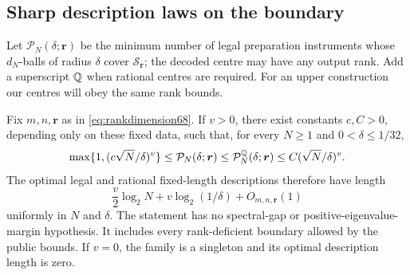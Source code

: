 \subsection{Sharp description laws on the boundary}
Let $\mathcal P_N(\delta;\boldsymbol r)$ be the minimum number of
legal preparation instruments whose $d_N$-balls of radius $\delta$
cover $\mathcal S_{\boldsymbol r}$; the decoded centre may have any
output rank. Add a superscript $\mathbb Q$ when rational centres are required.
For an upper construction our centres will obey the same rank bounds.

\begin{theorem}\label{thm:rankentropy68}
Fix $m,n,\boldsymbol r$ as in \eqref{eq:rankdimension68}. If $v>0$,
there exist constants $c,C>0$, depending only on these fixed data,
such that, for every $N\ge1$ and $0<\delta\le1/32$,
\begin{equation}\label{eq:rankcover68}
 \max\{1,(c\sqrt N/\delta)^v\}
 \le\mathcal P_N(\delta;\boldsymbol r)
 \le\mathcal P_N^{\mathbb Q}(\delta;\boldsymbol r)
 \le C(\sqrt N/\delta)^v.
\end{equation}
The optimal legal and rational fixed-length descriptions therefore have
length
\begin{equation}\label{eq:rankbits68}
 \frac v2\log_2N+v\log_2(1/\delta)+O_{m,n,\boldsymbol r}(1)
\end{equation}
uniformly in $N$ and $\delta$. The statement has no spectral-gap or
positive-eigenvalue-margin hypothesis. It includes every rank-deficient
boundary allowed by the public bounds. If $v=0$, the family is a
singleton and its optimal description length is zero.
\end{theorem}
